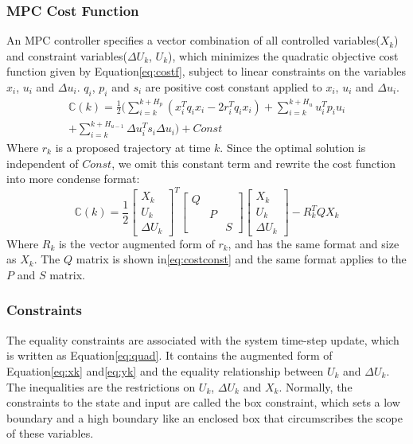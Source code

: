\subsubsection{MPC Cost Function}
An MPC controller specifies a vector combination of all controlled variables($X_k$) and constraint variables($\Delta U_k$, $U_k$), which minimizes the quadratic objective cost function given by Equation\cref{eq:costf}, subject to linear constraints on the variables $x_i$, $u_i$ and $\Delta u_i$. $q_i$, $p_i$ and $s_i$ are positive cost constant applied to $x_i$, $u_i$ and $\Delta u_i$.
\begin{equation}
\begin{split}
\mathbb{C}(k)=\frac{1}{2}\Big( \sum_{i=k}^{k+H_p}(x_i^Tq_ix_i-2r_i^Tq_ix_i)+\sum_{i=k}^{k+H_u}u_i^Tp_iu_i\\
+\sum_{i=k}^{k+H_{u-1}}\Delta u_i^Ts_i\Delta u_i\Big)+Const
\label{eq:costf}
\end{split}
\end{equation}
Where $r_k$ is a proposed trajectory at time $k$. Since the optimal solution is independent of $Const$, we omit this constant term and rewrite the cost function into more condense format:
\begin{equation}
\mathbb{C}(k)=\frac{1}{2}
\begin{bmatrix}
X_k\\
U_k\\
\Delta U_k
\end{bmatrix}^T
\begin{bmatrix}
Q& & \\
 &P& \\
& &S 
\end{bmatrix}
\begin{bmatrix}
X_k\\
U_k\\
\Delta U_k
\end{bmatrix}
-
R_k^TQX_k
\end{equation}
Where $R_k$ is the vector augmented form of $r_k$, and has the same format and size as $X_k$. The $Q$ matrix is shown in\cref{eq:costconst} and the same format applies to the $P$ and $S$ matrix.

\subsubsection{Constraints}
The equality constraints are associated with the system time-step update, which is written as Equation\cref{eq:quad}. It contains the augmented form of Equation\cref{eq:xk} and\cref{eq:yk} and the equality relationship between $U_k$ and $\Delta U_k$. The inequalities are the restrictions on $U_k$, $\Delta U_k$ and $X_k$. Normally, the constraints to the state and input are called the box constraint, which sets a low boundary and a high boundary like an enclosed box that circumscribes the scope of these variables.

